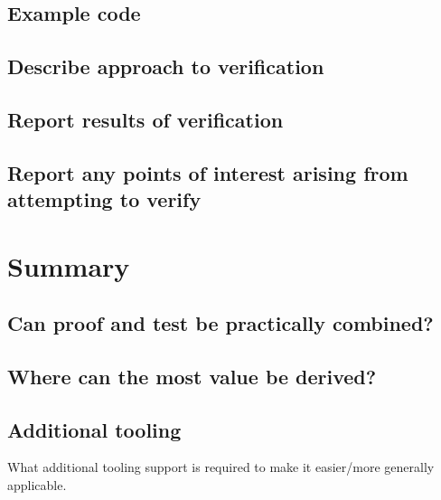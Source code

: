 \documentclass{llncs}
\begin{document}
\section{}
\subsection{Example code}
\subsection{Describe approach to verification}
\subsection{Report results of verification}
\subsection{Report any points of interest arising from attempting to verify}

\section{Summary}

\subsection{Can proof and test be practically combined?}

\subsection{Where can the most value be derived?}

\subsection{Additional tooling}
What additional tooling support is required to make it easier/more
generally applicable.




\end{document}
